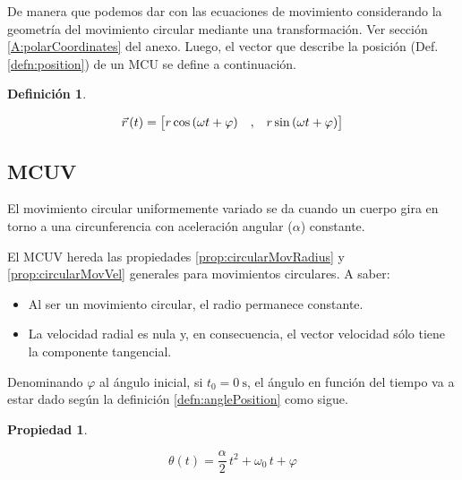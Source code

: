 \documentclass[a5paper,12pt,twoside]{book}
\newtheorem{defn}{{Definición}}[chapter]
\newtheorem{prop}{{Propiedad}}[chapter]
\begin{document}
De manera que podemos dar con las ecuaciones de movimiento considerando la geometría del movimiento circular mediante una transformación. Ver sección \ref{A:polarCoordinates} del anexo. Luego, el vector que describe la posición (Def. \ref{defn:position}) de un MCU se define a continuación.

\begin{mdframed}[style=MyFrame1]
    \begin{defn}
        \label{defn:MCUmovementEqns}
    \end{defn}
    \begin{equation*}
        \vec{r}\hspace{0.05cm}(t) = { \begin{bmatrix} r \cos{(\omega t + \varphi)} &,& r \sin{(\omega t + \varphi)} \end{bmatrix} }
    \end{equation*}
\end{mdframed}


\subsection{MCUV}

El movimiento circular uniformemente variado se da cuando un cuerpo gira en torno a una circunferencia con aceleración angular ($\alpha$) constante.

El MCUV hereda las propiedades \ref{prop:circularMovRadius} y \ref{prop:circularMovVel} generales para movimientos circulares. A saber:
\begin{itemize}
    \item Al ser un movimiento circular, el radio permanece constante.
    
    \item La velocidad radial es nula y, en consecuencia, el vector velocidad sólo tiene la componente tangencial.
\end{itemize}

Denominando $\varphi$ al ángulo inicial, si $t_0=\SI{0}{\second}$, el ángulo en función del tiempo va a estar dado según la definición \ref{defn:anglePosition} como sigue.

\begin{mdframed}[style=MyFrame1]
    \begin{prop}
    \end{prop}
    \begin{equation*}
        \theta (t) = \frac{\alpha}{2} \, t^2 + \omega_0 \, t + \varphi
    \end{equation*}
\end{mdframed}
\end{document}
